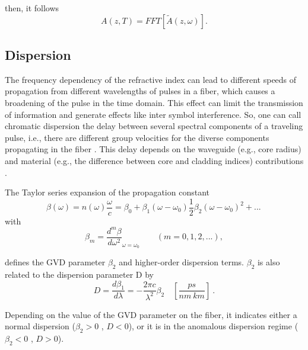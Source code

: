         then, it follows
        \begin{equation} \label{eq_deffft}
                A(z,T) = FFT \left[ \tilde{A}(z,\omega) \right].
            \end{equation}
            
            
    \subsection{Dispersion}
        The frequency dependency of the refractive index can lead to different speeds of propagation from different wavelengths of pulses in a fiber, which causes a broadening of the pulse in the time domain. This effect can limit the transmission of information and generate effects like inter symbol interference.  So, one can call chromatic dispersion the delay between several spectral components of a traveling pulse, i.e., there are different group velocities for the diverse components propagating in the fiber  \citep{Udayakumar2013ChromaticDC}. This delay depends on the waveguide (e.g., core radius) and material (e.g., the difference between core and cladding indices) contributions \citep{dudley_taylor_2010}. 
        
        The Taylor series expansion of the propagation constant 
        \begin{equation}
             \beta(\omega) = n (\omega)\frac{\omega}{c} = \beta_0 + \beta_1(\omega-\omega_0) \frac{1}{2}\beta_2(\omega-\omega_0)^2+...\, 
             \label{eq_betas}
        \end{equation}
        with 
        \begin{equation}
            \beta_m = \frac{d^m\beta}{d\omega^2}_{\omega = \omega_0} \qquad (m = 0,1,2,...),
            \label{eq_dbeta}
        \end{equation}
        
        
        defines the \gls{GVD} parameter $\beta_2$  and higher-order dispersion terms.  $\beta_2$ is also related to the dispersion parameter D by
        \begin{equation}
            D = \frac{d\beta_1}{d\lambda} = - \frac{2\pi c}{\lambda^2}\beta_2 \quad [\frac{ps}{nm \ km}] \ .
            \label{eq_Ds}
        \end{equation}
        
        Depending on the value of the \Gls{GVD} parameter on the fiber, it indicates either a normal dispersion ($\beta_2 > 0$ , $D<0$), or it is in the anomalous dispersion regime ($\beta_2 < 0$ , $D>0$).
        
